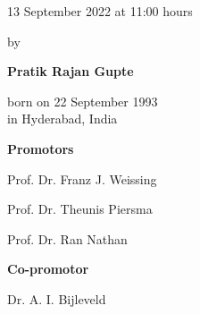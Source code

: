 \begin{titlepage}
\begin{addmargin}[-1cm]{-3cm}
\begin{center}
{            \vspace{3mm}

            13 September 2022 at 11:00 hours

            \vspace{10mm}

            by

            \vspace{10mm}

            \textbf{Pratik Rajan Gupte}

            \vspace{3mm}

            born on 22 September 1993\\
            in Hyderabad, India
        }

    \end{center}

    \pagebreak
    \thispagestyle{empty}

    \textbf{Promotors}
    \begin{description}
        \item Prof. Dr. Franz J. Weissing
        \item Prof. Dr. Theunis Piersma
        \item Prof. Dr. Ran Nathan
    \end{description}

    \vspace{6mm}

    \textbf{Co-promotor}
    \begin{description}
        \item Dr. A. I. Bijleveld
    \end{description}



  \end{addmargin}

\end{titlepage}


    


